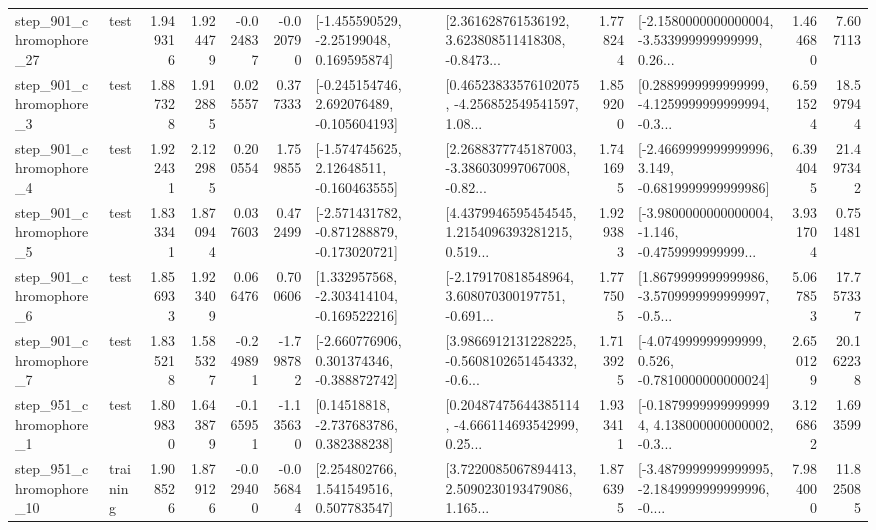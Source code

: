 \begin{tabular}{llrrrrllrlrr}
  step\_901\_chromophore\_27 &      test &      1.949316 &    1.924479 &     -0.024837 & -0.020790 &    [-1.455590529, -2.25199048, 0.169595874] &  [2.361628761536192, 3.623808511418308, -0.8473... &       1.778244 &  [-2.1580000000000004, -3.533999999999999, 0.26... &            1.464680 &          7.607113 \\
   step\_901\_chromophore\_3 &      test &      1.887328 &    1.912885 &      0.025557 &  0.377333 &   [-0.245154746, 2.692076489, -0.105604193] &  [0.46523833576102075, -4.256852549541597, 1.08... &       1.859200 &  [0.2889999999999999, -4.1259999999999994, -0.3... &            6.591524 &         18.597944 \\
   step\_901\_chromophore\_4 &      test &      1.922431 &    2.122985 &      0.200554 &  1.759855 &    [-1.574745625, 2.12648511, -0.160463555] &  [2.2688377745187003, -3.386030997067008, -0.82... &       1.741695 &  [-2.4669999999999996, 3.149, -0.6819999999999986] &            6.394045 &         21.497342 \\
   step\_901\_chromophore\_5 &      test &      1.833341 &    1.870944 &      0.037603 &  0.472499 &  [-2.571431782, -0.871288879, -0.173020721] &  [4.4379946595454545, 1.2154096393281215, 0.519... &       1.929383 &  [-3.9800000000000004, -1.146, -0.4759999999999... &            3.931704 &          0.751481 \\
   step\_901\_chromophore\_6 &      test &      1.856933 &    1.923409 &      0.066476 &  0.700606 &   [1.332957568, -2.303414104, -0.169522216] &  [-2.179170818548964, 3.608070300197751, -0.691... &       1.777505 &  [1.8679999999999986, -3.5709999999999997, -0.5... &            5.067853 &         17.757337 \\
   step\_901\_chromophore\_7 &      test &      1.835218 &    1.585327 &     -0.249891 & -1.798782 &   [-2.660776906, 0.301374346, -0.388872742] &  [3.9866912131228225, -0.5608102651454332, -0.6... &       1.713925 &   [-4.074999999999999, 0.526, -0.7810000000000024] &            2.650129 &         20.162238 \\
   step\_951\_chromophore\_1 &      test &      1.809830 &    1.643879 &     -0.165951 & -1.135630 &     [0.14518818, -2.737683786, 0.382388238] &  [0.20487475644385114, -4.666114693542999, 0.25... &       1.933411 &  [-0.18799999999999994, 4.138000000000002, -0.3... &            3.126862 &          1.693599 \\
  step\_951\_chromophore\_10 &  training &      1.908526 &    1.879126 &     -0.029400 & -0.056844 &     [2.254802766, 1.541549516, 0.507783547] &  [3.7220085067894413, 2.5090230193479086, 1.165... &       1.876395 &  [-3.4879999999999995, -2.1849999999999996, -0.... &            7.984000 &         11.825085 \\

\end{tabular}

